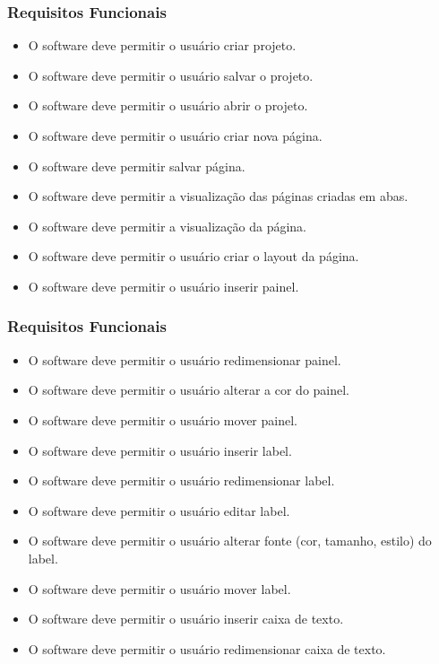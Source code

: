 \documentclass{beamer}
\begin{document}
	
\begin{frame}
  \frametitle{Requisitos Funcionais}
\begin{itemize}

\item O software deve permitir o usuário criar projeto.
\item O software deve permitir o usuário salvar  o projeto.
\item O software deve permitir o usuário abrir o projeto.
\item O software deve permitir o usuário criar  nova página.
\item O software deve permitir salvar página.
\item O  software deve permitir a visualização das páginas criadas em abas.
\item O software deve permitir a visualização da página.
\item O software deve permitir o usuário  criar o layout da página.
\item O software deve permitir o usuário  inserir painel.

\end{itemize}

	\end{frame}
	
	
\begin{frame}
  \frametitle{Requisitos Funcionais}
\begin{itemize}


\item O software deve permitir o usuário redimensionar  painel.
\item  O software deve permitir o usuário alterar  a cor do painel.
\item  O software deve permitir o usuário  mover painel.
\item  O software deve permitir o usuário  inserir label.
\item  O software deve permitir o usuário  redimensionar label.
\item O software deve permitir o usuário  editar label.
\item  O software deve permitir o usuário  alterar fonte (cor, tamanho, estilo) do label.
\item  O software deve permitir o usuário  mover label.
\item  O software deve permitir o usuário  inserir caixa de texto.
\item  O software deve permitir o usuário  redimensionar caixa de texto.

\end{itemize}

	\end{frame}
\end{document}
